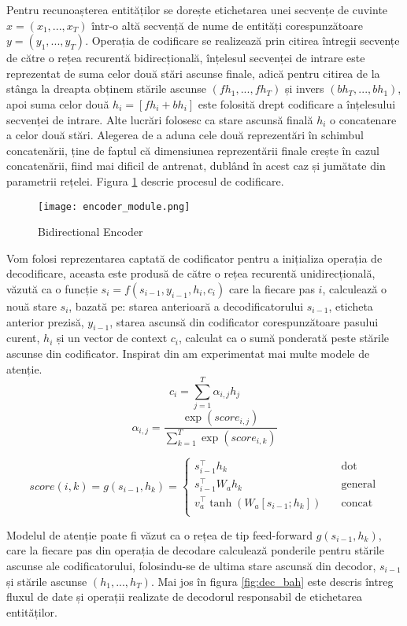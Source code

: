 Pentru recunoașterea entităților se dorește etichetarea unei secvențe de cuvinte $ x= (x_1, ..., x_T)$ într-o altă secvență de nume de entități corespunzătoare $ y=(y_1, ..., y_T) $. Operația de codificare se realizează prin citirea întregii secvențe de către o rețea recurentă bidirecțională, înțelesul secvenței de intrare este reprezentat de suma celor două stări ascunse finale, adică pentru citirea de la stânga la dreapta obținem stările ascunse $(fh_1, ..., fh_T)$ și invers $(bh_T, ..., bh_1)$, apoi suma celor două $h_i = [fh_i + bh_i]$ este folosită drept codificare a înțelesului secvenței de intrare. Alte lucrări \cite{joint_online_bing} folosesc ca stare ascunsă finală $h_i$ o concatenare a celor două stări. Alegerea de a aduna cele două reprezentări în schimbul concatenării, ține de faptul că dimensiunea reprezentării finale crește în cazul concatenării, fiind mai dificil de antrenat, dublând în acest caz și jumătate din parametrii rețelei. Figura \ref{fig:enc_module} descrie procesul de codificare.

\begin{figure}[h]
	\centering
	\texttt{[image: encoder\_module.png]}
	\caption{Bidirectional Encoder}
	\label{fig:enc_module}
\end{figure}

Vom folosi reprezentarea captată de codificator pentru a inițializa operația de decodificare, aceasta este produsă de către o rețea recurentă unidirecțională, văzută ca o funcție $s_i=f(s_{i-1}, y_{i-1}, h_i, c_i)$ care la fiecare pas $i$, calculează o nouă stare $s_i$, bazată pe: starea anterioară a decodificatorului $s_{i-1}$, eticheta anterior prezisă, $y_{i-1}$, starea ascunsă din codificator corespunzătoare pasului curent, $h_i$ și un vector de context $c_i$, calculat ca o sumă ponderată peste stările ascunse din codificator.
Inspirat din \cite{trans_luong_manning} am experimentat mai multe modele de atenție.
$$ c_i = \sum_{j=1}^{T} \alpha_{i,j} h_j$$
$$ \alpha_{i,j} = \frac{\exp(score_{i, j})}{\sum_{k=1}^{T} \exp(score_{i, k})}$$

\[ score(i, k) = g(s_{i-1}, h_k) =
\begin{cases}
s_{i-1}^\top h_k			&	\quad \text{dot}\\
s_{i-1}^\top W_a h_k	&	\quad \text{general}\\
v_a^\top \tanh(W_a [s_{i-1};h_k])	&	\quad \text{concat}\\
\end{cases}
\]

Modelul de atenție poate fi văzut ca o rețea de tip feed-forward $g(s_{i-1}, h_k)$, care la fiecare pas din operația de decodare calculează ponderile pentru stările ascunse ale codificatorului, folosindu-se de ultima stare ascunsă din decodor, $s_{i-1}$ și stările ascunse $(h_1, ..., h_T)$. Mai jos în figura \ref{fig:dec_bah} este descris întreg fluxul de date și operații realizate de decodorul responsabil de etichetarea entităților.

